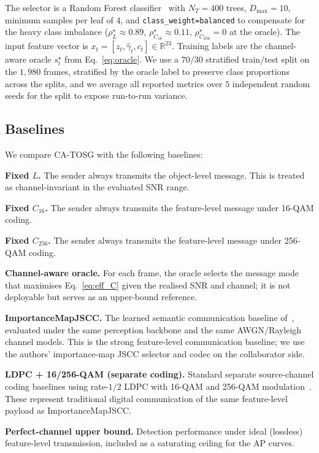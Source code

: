 \documentclass[journal]{IEEEtran}
\newcommand{\method}{CA-TOSG}
\begin{document}
The selector is a Random Forest classifier~\cite{breiman2001random} with $N_T=400$ trees, $D_{\max}=10$, minimum samples per leaf of $4$, and \texttt{class\_weight=balanced} to compensate for the heavy class imbalance ($\rho_L^\star \approx 0.89$, $\rho_{C_{16}}^\star \approx 0.11$, $\rho_{C_{256}}^\star = 0$ at the oracle). The input feature vector is $x_t = [z_t,\hat\gamma_t,c_t] \in \mathbb{R}^{23}$. Training labels are the channel-aware oracle $s_t^\star$ from Eq.~\eqref{eq:oracle}. We use a $70/30$ stratified train/test split on the $1{,}980$ frames, stratified by the oracle label to preserve class proportions across the splits, and we average all reported metrics over $5$ independent random seeds for the split to expose run-to-run variance.

\subsection{Baselines}

We compare \method{} with the following baselines:

\textbf{Fixed $L$.} The sender always transmits the object-level message. This is treated as channel-invariant in the evaluated SNR range.

\textbf{Fixed $C_{16}$.} The sender always transmits the feature-level message under 16-QAM coding.

\textbf{Fixed $C_{256}$.} The sender always transmits the feature-level message under 256-QAM coding.

\textbf{Channel-aware oracle.} For each frame, the oracle selects the message mode that maximises Eq.~\eqref{eq:eff_C} given the realised SNR and channel; it is not deployable but serves as an upper-bound reference.

\textbf{ImportanceMapJSCC.} The learned semantic communication baseline of~\cite{sheng2024importance}, evaluated under the same perception backbone and the same AWGN/Rayleigh channel models. This is the strong feature-level communication baseline; we use the authors' importance-map JSCC selector and codec on the collaborator side.

\textbf{LDPC + 16/256-QAM (separate coding).} Standard separate source-channel coding baselines using rate-$1/2$ LDPC with 16-QAM and 256-QAM modulation~\cite{ieee80211bd}. These represent traditional digital communication of the same feature-level payload as ImportanceMapJSCC.

\textbf{Perfect-channel upper bound.} Detection performance under ideal (lossless) feature-level transmission, included as a saturating ceiling for the AP curves.
\end{document}
